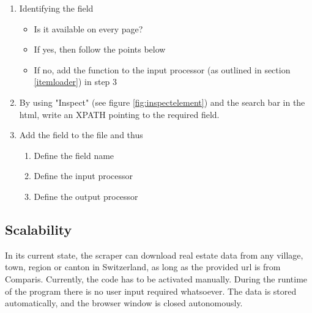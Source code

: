 \documentclass[main]{subfiles}
\begin{document}
\begin{enumerate}
    \item Identifying the field
    \begin{itemize}
        \item Is it available on every page?
        \item If yes, then follow the points below
        \item If no, add the  function to the input processor (as outlined in section \ref{itemloader}) in step $3$
    \end{itemize}
    \item By using "Inspect" (see figure \ref{fig:inspectelement}) and the search bar in the \acs*{html}, write an XPATH pointing to the required field.
    \item Add the field to the \pkg[items.py] file and thus
    \begin{enumerate}
        \item Define the field name
        \item Define the input processor
        \item Define the output processor
    \end{enumerate}
\end{enumerate}


\subsection{Scalability}
In its current state, the scraper can download real estate data from any village, town, region or canton in Switzerland,
as long as the provided \acs*{url} is from Comparis.
Currently, the code has to be activated manually.
During the runtime of the program there is no user input required whatsoever.
The data is stored automatically, and the browser window is closed autonomously.
\end{document}
